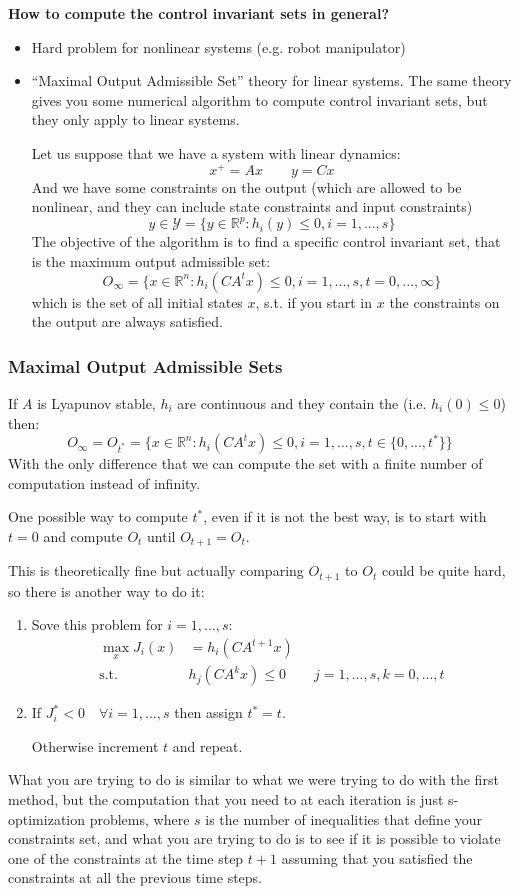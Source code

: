 \begin{center}
\textbf{How to compute the control invariant sets in general?}
\end{center}
\begin{itemize}
\item Hard problem for nonlinear systems (e.g. robot manipulator)
\item ``Maximal Output Admissible Set'' theory for linear systems. The same theory gives you some numerical algorithm to compute control invariant sets, but they only apply to linear systems.

Let us suppose that we have a system with linear dynamics:
\[x^+ = Ax\qquad y=Cx\]
And we have some constraints on the output (which are allowed to be nonlinear, and they can include state constraints and input constraints)
\[y\in\mathcal{Y} = \{y\in\mathbb{R}^p: h_i(y)\le 0, i=1,...,s\}\]
The objective of the algorithm is to find a specific control invariant set, that is the maximum output admissible set:
\[O_{\infty} = \{x\in\mathbb{R}^n: h_i(CA^tx)\le 0, i=1,...,s, t=0,...,\infty\}\]
which is the set of all initial states $x$, s.t. if you start in $x$ the constraints on the output are always satisfied.
\end{itemize}

\subsubsection{Maximal Output Admissible Sets}
\begin{theorem}
If $A$ is Lyapunov stable, $h_i$ are continuous and they contain the  (i.e. $h_i(0)\le0$) then:
\[O_{\infty} = O_{t^*} = \{x\in\mathbb{R}^n: h_i(CA^tx)\le 0, i=1,...,s, t\in\{0, ..., t^*\}\}\]
With the only difference that we can compute the set with a finite number of computation instead of infinity.
\end{theorem}
One possible way to compute $t^*$, even if it is not the best way, is to start with $t=0$ and compute $O_t$ until $O_{t+1}=O_t$.

This is theoretically fine but actually comparing $O_{t+1}$ to $O_t$ could be quite hard, so there is another way to do it:
\begin{enumerate}
\item Sove this problem for $i=1,...,s$:
\begin{align*}
\max_x J_i(x) &= h_i(CA^{t+1}x)\\
\text{s.t. } & h_j(CA^kx)\le 0\qquad j=1,...,s , k=0,...,t
\end{align*}
\item If $J_i^* < 0 \quad \forall i = 1,...,s$ then assign $t^* = t$.

Otherwise increment $t$ and repeat.
\end{enumerate}
What you are trying to do is similar to what we were trying to do with the first method, but the computation that you need to at each iteration is just s-optimization problems, where $s$ is the number of inequalities that define your constraints set, and what you are trying to do is to see if it is possible to violate one of the constraints at the time step  $t+1$ assuming that you satisfied the constraints at all the previous time steps.

